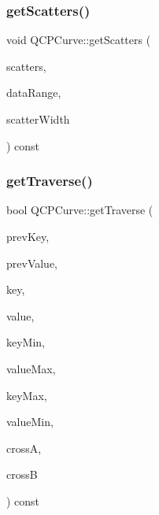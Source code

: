 \mbox{\label{class_q_c_p_curve_a564c5fdc8409e3532b1322389a8434b8}} 
\subsubsection{\texorpdfstring{getScatters()}{getScatters()}}
{\footnotesize\ttfamily void Q\+C\+P\+Curve\+::get\+Scatters (\begin{DoxyParamCaption}\item[{Q\+Vector$<$ Q\+PointF $>$ $\ast$}]{scatters,  }\item[{const \mbox{\hyperlink{class_q_c_p_data_range}{Q\+C\+P\+Data\+Range}} \&}]{data\+Range,  }\item[{double}]{scatter\+Width }\end{DoxyParamCaption}) const\hspace{0.3cm}{\ttfamily [protected]}}

\mbox{\label{class_q_c_p_curve_afc5367ef0369d7a88ebba6eacf55f14f}} 
\subsubsection{\texorpdfstring{getTraverse()}{getTraverse()}}
{\footnotesize\ttfamily bool Q\+C\+P\+Curve\+::get\+Traverse (\begin{DoxyParamCaption}\item[{double}]{prev\+Key,  }\item[{double}]{prev\+Value,  }\item[{double}]{key,  }\item[{double}]{value,  }\item[{double}]{key\+Min,  }\item[{double}]{value\+Max,  }\item[{double}]{key\+Max,  }\item[{double}]{value\+Min,  }\item[{Q\+PointF \&}]{crossA,  }\item[{Q\+PointF \&}]{crossB }\end{DoxyParamCaption}) const\hspace{0.3cm}{\ttfamily [protected]}}

\mbox{\label{class_q_c_p_curve_a55e24387fd97a2cad0def8a40809e9ec}} 
